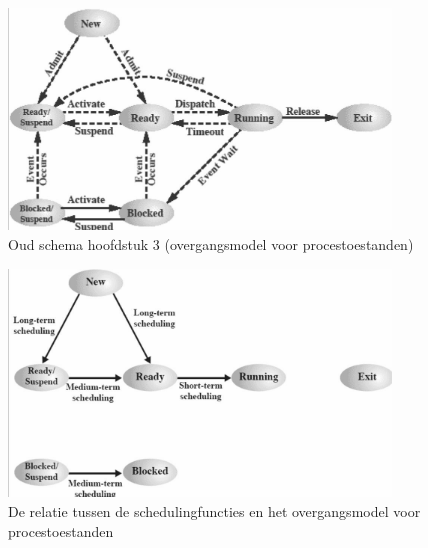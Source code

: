 \begin{figure}[htp]
    \centering
            \includegraphics[width=4in]{img/overgangsmodelvoorprocestoestanden.png}
        \caption{Oud schema hoofdstuk 3 (overgangsmodel voor procestoestanden)}
    \label{fig:Oud schema hoofdstuk 3 (overgangsmodel voor procestoestanden)}
\end{figure}

\begin{figure}[htp]
    \centering
            \includegraphics[width=4in]{img/schedulingsfuncties.png}
        \caption{De relatie tussen de schedulingfuncties en het overgangsmodel voor procestoestanden}
    \label{fig:De relatie tussen de schedulingfuncties en het overgangsmodel voor procestoestanden}
\end{figure}

